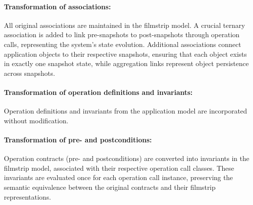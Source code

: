 \paragraph{Transformation of associations:} All original associations are maintained 
in the filmstrip model. A crucial ternary association is added to link pre-snapshots 
to post-snapshots through operation calls, representing the system's state evolution. 
Additional associations connect application objects to their respective snapshots, 
ensuring that each object exists in exactly one snapshot state, while aggregation 
links represent object persistence across snapshots.
\vspace{-1.2em}
\paragraph{Transformation of operation definitions and invariants:} Operation 
definitions and invariants from the application model are incorporated without 
modification.
\vspace{-1.2em}
\paragraph{Transformation of pre- and postconditions:} Operation contracts (pre- and 
postconditions) are converted into invariants in the filmstrip model, associated with 
their respective operation call classes. These invariants are evaluated once for each 
operation call instance, preserving the semantic equivalence between the original 
contracts and their filmstrip representations.

